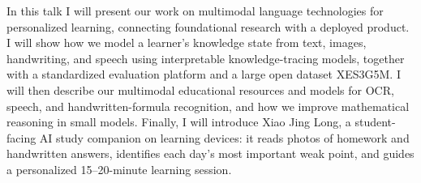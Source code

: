 In this talk I will present our work on multimodal language technologies for personalized learning, connecting foundational research with a deployed product. I will show how we model a learner's knowledge state from text, images, handwriting, and speech using interpretable knowledge-tracing models, together with a standardized evaluation platform and a large open dataset XES3G5M. I will then describe our multimodal educational resources and models for OCR, speech, and handwritten-formula recognition, and how we improve mathematical reasoning in small models. Finally, I will introduce Xiao Jing Long, a student-facing AI study companion on learning devices: it reads photos of homework and handwritten answers, identifies each day's most important weak point, and guides a personalized 15--20-minute learning session.

